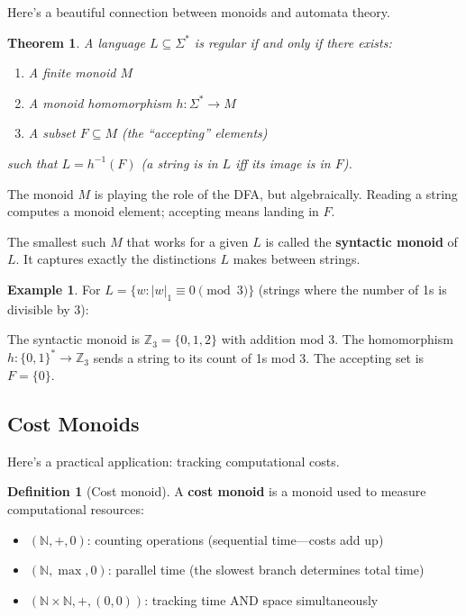 \documentclass[11pt]{article}
\newcommand{\N}{\mathbb{N}}
\newcommand{\Z}{\mathbb{Z}}
\theoremstyle{definition}
\newtheorem{definition}{Definition}[section]
\newtheorem{example}{Example}[section]
\theoremstyle{plain}
\newtheorem{theorem}{Theorem}[section]
\theoremstyle{remark}
\begin{document}
Here's a beautiful connection between monoids and automata theory.

\begin{theorem}
A language $L \subseteq \Sigma^*$ is regular if and only if there exists:
\begin{enumerate}
  \item A \emph{finite} monoid $M$
  \item A monoid homomorphism $h: \Sigma^* \to M$
  \item A subset $F \subseteq M$ (the ``accepting'' elements)
\end{enumerate}
such that $L = h^{-1}(F)$ (a string is in $L$ iff its image is in $F$).
\end{theorem}

The monoid $M$ is playing the role of the DFA, but algebraically. Reading a string computes a monoid element; accepting means landing in $F$.

The smallest such $M$ that works for a given $L$ is called the \textbf{syntactic monoid} of $L$. It captures exactly the distinctions $L$ makes between strings.

\begin{example}
For $L = \{w : |w|_1 \equiv 0 \pmod{3}\}$ (strings where the number of 1s is divisible by 3):

The syntactic monoid is $\Z_3 = \{0, 1, 2\}$ with addition mod 3. The homomorphism $h: \{0, 1\}^* \to \Z_3$ sends a string to its count of 1s mod 3. The accepting set is $F = \{0\}$.
\end{example}

\subsection{Cost Monoids}

Here's a practical application: tracking computational costs.

\begin{definition}[Cost monoid]
A \textbf{cost monoid} is a monoid used to measure computational resources:
\begin{itemize}
  \item $(\N, +, 0)$: counting operations (sequential time---costs add up)
  \item $(\N, \max, 0)$: parallel time (the slowest branch determines total time)
  \item $(\N \times \N, +, (0,0))$: tracking time AND space simultaneously
\end{itemize}
\end{definition}
\end{document}

